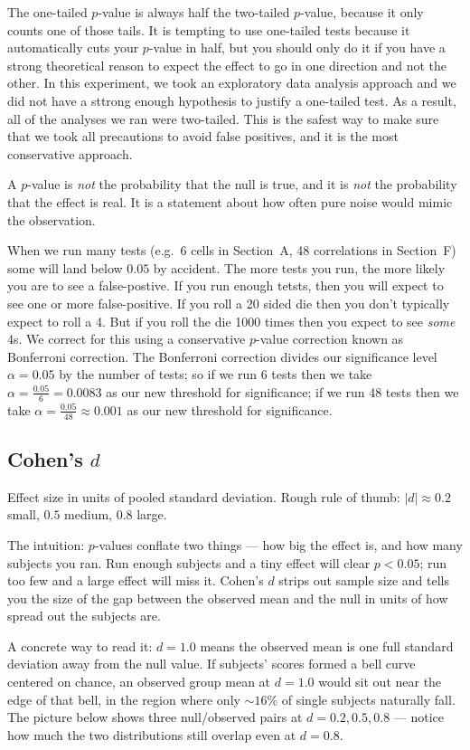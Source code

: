 \documentclass[11pt]{article}
\begin{document}
The one-tailed $p$-value is always half the two-tailed $p$-value, because it only counts one of those tails. It is tempting to use one-tailed tests because it automatically cuts your $p$-value in half, but you should only do it if you have a strong theoretical reason to expect the effect to go in one direction and not the other. 
In this experiment, we took an exploratory data analysis approach and we did not have a sttrong enough hypothesis to justify a one-tailed test. As a result, all of the analyses we ran were two-tailed. This is the safest way to make sure that we took all precautions to avoid false positives, and it is the most conservative approach. 

A $p$-value is \emph{not} the probability that the null is true, and
it is \emph{not} the probability that the effect is real. It is a
statement about how often pure noise would mimic the observation.

When we run many tests (e.g.\ 6 cells in Section~A, 48 correlations in
Section~F) some will land below $0.05$ by accident. The more tests you run, the more likely you are to see a false-postive.
If you run enough tetsts, then you will expect to see one or more false-positive. 
If you roll a 20 sided die then you don't typically expect to roll a 4. But if you roll the die 1000 times then you expect to see \textit{some} 4s.
We correct for this using a conservative $p$-value correction known as Bonferroni correction. The Bonferroni 
correction divides our significance level $\alpha = 0.05$ by the number of tests; so if we run 6 tests then we take $\alpha = \frac{0.05}{6} = 0.0083$ as our new threshold for significance; if we run 48 tests then we take $\alpha = \frac{0.05}{48} \approx 0.001$ as our new threshold for significance. 

\subsection{Cohen's $d$}
Effect size in units of pooled standard deviation. Rough rule of thumb:
$|d| \approx 0.2$ small, $0.5$ medium, $0.8$ large.

The intuition: $p$-values conflate two things --- how big the effect is,
and how many subjects you ran. Run enough subjects and a tiny effect
will clear $p < 0.05$; run too few and a large effect will miss it.
Cohen's $d$ strips out sample size and tells you the size of the gap
between the observed mean and the null in units of how spread out the
subjects are.

A concrete way to read it: $d = 1.0$ means the observed mean is one
full standard deviation away from the null value. If subjects' scores
formed a bell curve centered on chance, an observed group mean at
$d = 1.0$ would sit out near the edge of that bell, in the region
where only $\sim 16\%$ of single subjects naturally fall. The picture
below shows three null/observed pairs at $d = 0.2, 0.5, 0.8$ ---
notice how much the two distributions still overlap even at $d = 0.8$.
\end{document}
